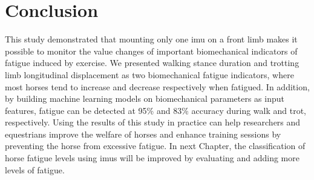 \section{Conclusion}
\label{sec:conclusion}

This study demonstrated that mounting only one \gls{imu} on a front limb makes it possible to monitor the value changes of important biomechanical indicators of fatigue induced by exercise. We presented walking stance duration and trotting limb longitudinal displacement as two biomechanical fatigue indicators, where most horses tend to increase and decrease respectively when fatigued. In addition, by building machine learning models on biomechanical parameters as input features, fatigue can be detected at 95\% and 83\% accuracy during walk and trot, respectively.  Using the results of this study in practice can help researchers and equestrians improve the welfare of horses and enhance training sessions by preventing the horse from excessive fatigue. In next Chapter, the classification of horse fatigue levels using \gls{imu}s will be improved by evaluating and adding more levels of fatigue.
